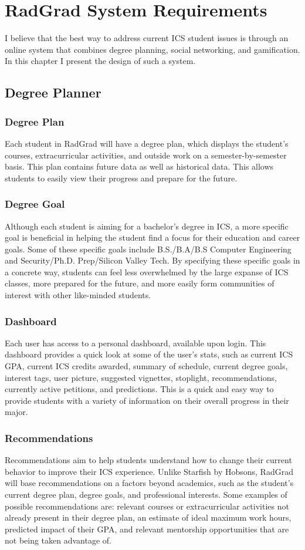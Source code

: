 \chapter{RadGrad System Requirements}
I believe that the best way to address current ICS student issues is through an online system that combines degree planning, social networking, and gamification. In this chapter I present the design of such a system. 
\section{Degree Planner}
\subsection{Degree Plan}
Each student in RadGrad will have a degree plan, which displays the student's courses, extracurricular activities, and outside work on a semester-by-semester basis. This plan contains future data as well as historical data. This allows students to easily view their progress and prepare for the future. 
\subsection{Degree Goal}
Although each student is aiming for a bachelor's degree in ICS, a more specific goal is beneficial in helping the student find a focus for their education and career goals. Some of these specific goals include B.S./B.A/B.S Computer Engineering and Security/Ph.D. Prep/Silicon Valley Tech. By specifying these specific goals in a concrete way, students can feel less overwhelmed by the large expanse of ICS classes, more prepared for the future, and more easily form communities of interest with other like-minded students.
\subsection{Dashboard}
Each user has access to a personal dashboard, available upon login. This dashboard provides a quick look at some of the user's stats, such as current ICS GPA, current ICS credits awarded, summary of schedule, current degree goals, interest tags, user picture, suggested vignettes, stoplight, recommendations, currently active petitions, and predictions. This is a quick and easy way to provide students with a variety of information on their overall progress in their major. 

\subsection{Recommendations}
Recommendations aim to help students understand how to change their current behavior to improve their ICS experience. Unlike Starfish by Hobsons, RadGrad will base recommendations on a factors beyond academics, such as the student's current degree plan, degree goals, and professional interests. Some examples of possible recommendations are: relevant courses or extracurricular activities not already present in their degree plan, an estimate of ideal maximum work hours, predicted impact of their GPA, and relevant mentorship opportunities that are not being taken advantage of. 
